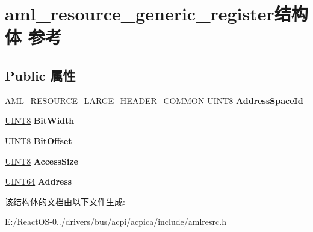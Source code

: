 \hypertarget{structaml__resource__generic__register}{}\section{aml\+\_\+resource\+\_\+generic\+\_\+register结构体 参考}
\label{structaml__resource__generic__register}
\subsection*{Public 属性}
\begin{DoxyCompactItemize}
\item 
\mbox{\label{structaml__resource__generic__register_a1cb29d18c7f2ba1e56e45454b3e9d742}} 
A\+M\+L\+\_\+\+R\+E\+S\+O\+U\+R\+C\+E\+\_\+\+L\+A\+R\+G\+E\+\_\+\+H\+E\+A\+D\+E\+R\+\_\+\+C\+O\+M\+M\+ON \hyperlink{_processor_bind_8h_ab27e9918b538ce9d8ca692479b375b6a}{U\+I\+N\+T8} {\bfseries Address\+Space\+Id}
\item 
\mbox{\label{structaml__resource__generic__register_ae7aa483bd74c65ad1fbb446cb03e729c}} 
\hyperlink{_processor_bind_8h_ab27e9918b538ce9d8ca692479b375b6a}{U\+I\+N\+T8} {\bfseries Bit\+Width}
\item 
\mbox{\label{structaml__resource__generic__register_a2360565b2e0674882193e1bcb2730a78}} 
\hyperlink{_processor_bind_8h_ab27e9918b538ce9d8ca692479b375b6a}{U\+I\+N\+T8} {\bfseries Bit\+Offset}
\item 
\mbox{\label{structaml__resource__generic__register_a1450e005e26ff54665bf18dbf95d234b}} 
\hyperlink{_processor_bind_8h_ab27e9918b538ce9d8ca692479b375b6a}{U\+I\+N\+T8} {\bfseries Access\+Size}
\item 
\mbox{\label{structaml__resource__generic__register_ac2b372e42ed74db1d518374e22025cc7}} 
\hyperlink{_processor_bind_8h_a57be03562867144161c1bfee95ca8f7c}{U\+I\+N\+T64} {\bfseries Address}
\end{DoxyCompactItemize}


该结构体的文档由以下文件生成\+:\begin{DoxyCompactItemize}
\item 
E\+:/\+React\+O\+S-\/0../drivers/bus/acpi/acpica/include/amlresrc.\+h\end{DoxyCompactItemize}
